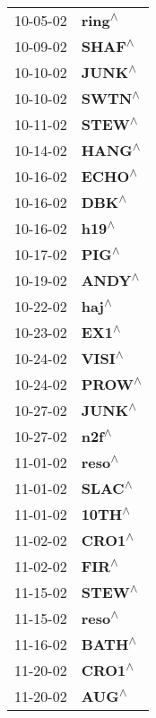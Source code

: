 \begin{supertabular}{p{0.08\textwidth}p{0.2\textwidth}}
 10-05-02 &    \textbf{ring\textsuperscript{$\wedge$}} \\
 10-09-02 &    \textbf{SHAF\textsuperscript{$\wedge$}} \\
 10-10-02 &    \textbf{JUNK\textsuperscript{$\wedge$}} \\
 10-10-02 &    \textbf{SWTN\textsuperscript{$\wedge$}} \\
 10-11-02 &    \textbf{STEW\textsuperscript{$\wedge$}} \\
 10-14-02 &    \textbf{HANG\textsuperscript{$\wedge$}} \\
 10-16-02 &    \textbf{ECHO\textsuperscript{$\wedge$}} \\
 10-16-02 &     \textbf{DBK\textsuperscript{$\wedge$}} \\
 10-16-02 &     \textbf{h19\textsuperscript{$\wedge$}} \\
 10-17-02 &     \textbf{PIG\textsuperscript{$\wedge$}} \\
 10-19-02 &    \textbf{ANDY\textsuperscript{$\wedge$}} \\
 10-22-02 &     \textbf{haj\textsuperscript{$\wedge$}} \\
 10-23-02 &     \textbf{EX1\textsuperscript{$\wedge$}} \\
 10-24-02 &    \textbf{VISI\textsuperscript{$\wedge$}} \\
 10-24-02 &    \textbf{PROW\textsuperscript{$\wedge$}} \\
 10-27-02 &    \textbf{JUNK\textsuperscript{$\wedge$}} \\
 10-27-02 &     \textbf{n2f\textsuperscript{$\wedge$}} \\
 11-01-02 &    \textbf{reso\textsuperscript{$\wedge$}} \\
 11-01-02 &    \textbf{SLAC\textsuperscript{$\wedge$}} \\
 11-01-02 &    \textbf{10TH\textsuperscript{$\wedge$}} \\
 11-02-02 &    \textbf{CRO1\textsuperscript{$\wedge$}} \\
 11-02-02 &     \textbf{FIR\textsuperscript{$\wedge$}} \\
 11-15-02 &    \textbf{STEW\textsuperscript{$\wedge$}} \\
 11-15-02 &    \textbf{reso\textsuperscript{$\wedge$}} \\
 11-16-02 &    \textbf{BATH\textsuperscript{$\wedge$}} \\
 11-20-02 &    \textbf{CRO1\textsuperscript{$\wedge$}} \\
 11-20-02 &     \textbf{AUG\textsuperscript{$\wedge$}} \\

\end{supertabular}
